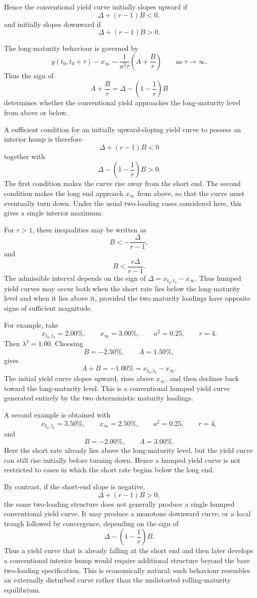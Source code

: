 \documentclass[12pt]{article}
\theoremstyle{statementstyle}
\begin{document}
Hence the conventional yield curve initially slopes upward if
\[
\Delta+(r-1)B<0,
\]
and initially slopes downward if
\[
\Delta+(r-1)B>0.
\]

The long-maturity behaviour is governed by
\[
y(t_0,t_0+\tau)-x_\infty
\sim
\frac{1}{a^2\tau}
\left(
A+\frac{B}{r}
\right)
\qquad
\text{as } \tau\to\infty.
\]
Thus the sign of
\[
A+\frac{B}{r}
=
\Delta-\left(1-\frac{1}{r}\right)B
\]
determines whether the conventional yield approaches the long-maturity level from above or below.

A sufficient condition for an initially upward-sloping yield curve to possess an interior hump is therefore
\[
\Delta+(r-1)B<0
\]
together with
\[
\Delta-\left(1-\frac{1}{r}\right)B>0.
\]
The first condition makes the curve rise away from the short end. The second condition makes the long end approach \(x_\infty\) from above, so that the curve must eventually turn down. Under the usual two-loading cases considered here, this gives a single interior maximum.

For \(r>1\), these inequalities may be written as
\[
B<-\frac{\Delta}{r-1},
\]
and
\[
B<\frac{r\Delta}{r-1}.
\]
The admissible interval depends on the sign of \(\Delta=x_{t_0,t_0}-x_\infty\). Thus humped yield curves may occur both when the short rate lies below the long-maturity level and when it lies above it, provided the two maturity loadings have opposite signs of sufficient magnitude.

For example, take
\[
x_{t_0,t_0}=2.00\%,
\qquad
x_\infty=3.00\%,
\qquad
a^2=0.25,
\qquad
r=4.
\]
Then \(\lambda^2=1.00\). Choosing
\[
B=-2.50\%,
\qquad
A=1.50\%,
\]
gives
\[
A+B=-1.00\%=x_{t_0,t_0}-x_\infty.
\]
The initial yield curve slopes upward, rises above \(x_\infty\), and then declines back toward the long-maturity level. This is a conventional humped yield curve generated entirely by the two deterministic maturity loadings.

A second example is obtained with
\[
x_{t_0,t_0}=3.50\%,
\qquad
x_\infty=2.50\%,
\qquad
a^2=0.25,
\qquad
r=4,
\]
and
\[
B=-2.00\%,
\qquad
A=3.00\%.
\]
Here the short rate already lies above the long-maturity level, but the yield curve can still rise initially before turning down. Hence a humped yield curve is not restricted to cases in which the short rate begins below the long end.

By contrast, if the short-end slope is negative,
\[
\Delta+(r-1)B>0,
\]
the same two-loading structure does not generally produce a single humped conventional yield curve. It may produce a monotone downward curve, or a local trough followed by convergence, depending on the sign of
\[
\Delta-\left(1-\frac{1}{r}\right)B.
\]
Thus a yield curve that is already falling at the short end and then later develops a conventional interior hump would require additional structure beyond the bare two-loading specification. This is economically natural: such behaviour resembles an externally disturbed curve rather than the undistorted rolling-maturity equilibrium.
\end{document}
